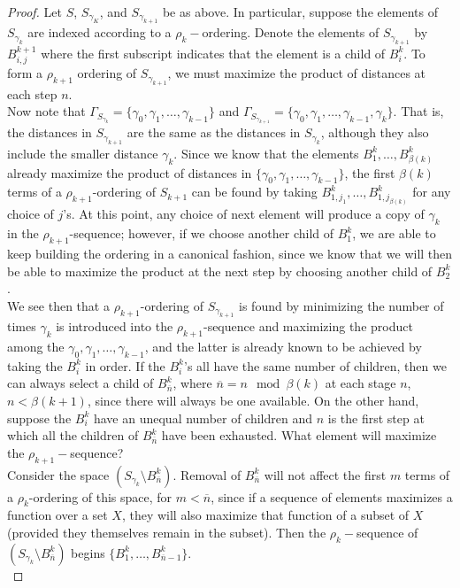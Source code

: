 \begin{proof}
Let $S$, $S_{\gamma_K}$, and $S_{\gamma_{k+1}}$ be as above. In particular, suppose the elements of $S_{\gamma_k}$ are indexed according to a $\rho_k-$ordering. Denote the elements of $S_{\gamma_{k+1}}$ by $B^{k+1}_{i,j}$ where the first subscript indicates that the element is a child of $B^k_i$. To form a $\rho_{k+1}$ ordering of $S_{\gamma_{k+1}}$, we must maximize the product of distances at each step $n$.\\

Now note that $\Gamma_{S_{\gamma_k}} = \{\gamma_0, \gamma_1,\ldots, \gamma_{k-1}\}$ and $\Gamma_{S_{\gamma_{k+1}}} = \{\gamma_0, \gamma_1,\ldots, \gamma_{k-1}, \gamma_{k}\}$. That is, the distances in $S_{\gamma_{k+1}}$ are the same as the distances in $S_{\gamma_k}$, although they also include the smaller distance $\gamma_k$. Since we know that the elements $B^k_1,\ldots,B^k_{\beta(k)}$ already maximize the product of distances in $\{\gamma_0, \gamma_1,\ldots, \gamma_{k-1}\}$, the first $\beta(k)$ terms of a $\rho_{k+1}$-ordering of $S_{k+1}$ can be found by taking $B^k_{1,j_1},\ldots, B^k_{1,j_{\beta(k)}}$ for any choice of $j$'s. At this point, any choice of next element will produce a copy of $\gamma_k$ in the $\rho_{k+1}$-sequence; however, if we choose another child of $B^k_{1}$, we are able to keep building the ordering in a canonical fashion, since we know that we will then be able to maximize the product at the next step by choosing another child of $B^k_{2}$.\\

We see then that a $\rho_{k+1}$-ordering of $S_{\gamma_{k+1}}$ is found by minimizing the number of times $\gamma_k$ is introduced into the $\rho_{k+1}$-sequence and maximizing the product among the $\gamma_0, \gamma_1,\ldots, \gamma_{k-1}$, and the latter is already known to be achieved by taking the $B^k_i$ in order.  If the $B^k_i$'s all have the same number of children, then we can always select a child of $B^k_{\overline{n}}$, where $\overline{n} = n \mod \beta(k)$ at each stage $n$, $n < \beta(k+1)$, since there will always be one available. On the other hand, suppose the $B^k_i$ have an unequal number of children and $n$ is the first step at which all the children of $B^k_{\overline{n}}$ have been exhausted. What element will maximize the $\rho_{k+1}-$sequence?\\

Consider the space $(S_{\gamma_k} \setminus B^k_{\overline{n}})$. Removal of $B^k_{\overline{n}}$ will not affect the first $m$ terms of a $\rho_k$-ordering of this space, for $m < \overline{n}$, since if a sequence of elements maximizes a function over a set $X$, they will also maximize that function of a subset of $X$ (provided they themselves remain in the subset). Then the $\rho_k-$sequence of $(S_{\gamma_k} \setminus B^k_{\overline{n}})$ begins $\{B^k_1,\ldots, B^k_{\overline{n}-1}\}$.\\


\end{proof}
